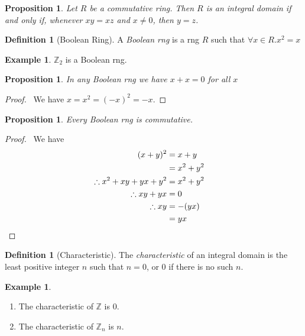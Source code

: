 \documentclass{article}
\let\qed\relax
\newtheorem{proposition}[axiom]{Proposition}
\theoremstyle{definition}
\newtheorem{definition}[axiom]{Definition}
\newtheorem{example}[axiom]{Example}
\begin{document}
    \begin{proposition}
        \label{proposition:cancellation}
        Let $R$ be a commutative ring. Then $R$ is an integral domain if and only if, whenever $xy = xz$
        and $x \neq 0$, then $y = z$.
    \end{proposition}

    \begin{definition}[Boolean Ring]
        A \emph{Boolean rng} is a rng $R$ such that $\forall x \in R. x^2 = x$
    \end{definition}

    \begin{example}
        $\mathbb{Z}_2$ is a Boolean rng.
    \end{example}

    \begin{proposition}
        In any Boolean rng we have $x + x = 0$ for all $x$
    \end{proposition}

    \begin{proof}
        \pf\ We have $x = x^2 = (-x)^2 = -x$. \qed
    \end{proof}

    \begin{proposition}
        Every Boolean rng is commutative.
    \end{proposition}

    \begin{proof}
        \pf\ We have
        \begin{align*}
            (x+y)^2 & = x+y \\
            & = x^2 + y^2 \\
            \therefore x^2 + xy + yx + y^2 & = x^2 + y^2 \\
            \therefore xy + yx & = 0 \\
            \therefore xy & = -(yx) \\
            & = yx & \qed
        \end{align*}
    \end{proof}

    \begin{definition}[Characteristic]
        The \emph{characteristic} of an integral domain is the least positive integer $n$ such that $n = 0$,
        or 0 if there is no such $n$.
    \end{definition}

    \begin{example}
        \begin{enumerate}
            \item The characteristic of $\mathbb{Z}$ is 0.
            \item The characteristic of $\mathbb{Z}_n$ is $n$.
        \end{enumerate}
    \end{example}
\end{document}
